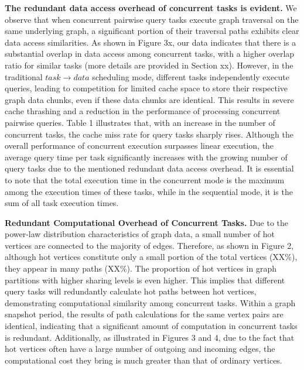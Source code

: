 \documentclass[lettersize,journal]{IEEEtran} %
\begin{document}
{\bf{The redundant data access overhead of concurrent tasks is evident.}} We observe that when concurrent pairwise query tasks execute graph traversal on the same underlying graph, a significant portion of their traversal paths exhibits clear data access similarities. As shown in Figure 3x, our data indicates that there is a substantial overlap in data access among concurrent tasks, with a higher overlap ratio for similar tasks (more details are provided in Section xx). However, in the traditional $task \rightarrow data$ scheduling mode, different tasks independently execute queries, leading to competition for limited cache space to store their respective graph data chunks, even if these data chunks are identical. This results in severe cache thrashing and a reduction in the performance of processing concurrent pairwise queries. Table 1 illustrates that, with an increase in the number of concurrent tasks, the cache miss rate for query tasks sharply rises. Although the overall performance of concurrent execution surpasses linear execution, the average query time per task significantly increases with the growing number of query tasks due to the mentioned redundant data access overhead. It is essential to note that the total execution time in the concurrent mode is the maximum among the execution times of these tasks, while in the sequential mode, it is the sum of all task execution times.


{\bf{Redundant Computational Overhead of Concurrent Tasks.}} Due to the power-law distribution characteristics of graph data, a small number of hot vertices are connected to the majority of edges. Therefore, as shown in Figure 2, although hot vertices constitute only a small portion of the total vertices (XX\%), they appear in many paths (XX\%). The proportion of hot vertices in graph partitions with higher sharing levels is even higher. This implies that different query tasks will redundantly calculate hot paths between hot vertices, demonstrating computational similarity among concurrent tasks. Within a graph snapshot period, the results of path calculations for the same vertex pairs are identical, indicating that a significant amount of computation in concurrent tasks is redundant. Additionally, as illustrated in Figures 3 and 4, due to the fact that hot vertices often have a large number of outgoing and incoming edges, the computational cost they bring is much greater than that of ordinary vertices.
\end{document}

